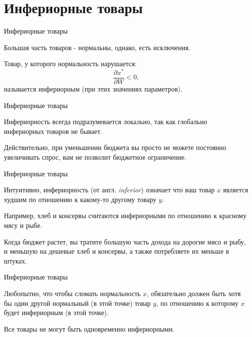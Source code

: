 \documentclass{beamer}
\begin{document}
\section{Инфериорные товары}

\begin{frame}{Инфериорные товары}

Большая часть товаров - нормальны, однако, есть исключения.

\begin{definition}
Товар, у которого нормальность нарушается:
$$\frac{\partial x^{\ast}}{\partial W} < 0,$$ 
называется \alert{инфериорным} (при этих значениях параметров). 
\end{definition}
\end{frame}

\begin{frame}{Инфериорные товары}

Инфериорность всегда подразумевается локально, так как \alert{глобально инфериорных товаров не бывает}. 

Действительно, при уменьшении бюджета вы просто не можете постоянно увеличивать спрос, вам не позволит бюджетное ограничение.

\end{frame}

\begin{frame}{Инфериорные товары}

Интуитивно, инфериорность (от англ. \textit{inferior}) означает что ваш товар $x$ является худшим по отношению к какому-то другому товару $y$. 

Например, хлеб и консервы считаются инфериорными по отношению к красному мясу и рыбе. 

Когда бюджет растет, вы тратите большую часть дохода на дорогие мясо и рыбу, и меньшую на дешевые хлеб и консервы, а также потребляете их меньше в штуках.

\end{frame}

\begin{frame}{Инфериорные товары}

Любопытно, что чтобы сломать нормальность $x$, обязательно должен быть хотя бы один другой нормальный (в этой точке) товар $y$, по отношению к которому $x$ будет инфериорным (в этой точке).

\begin{lemma}
Все товары не могут быть одновременно инфериорными.
\end{lemma}

\end{frame}
\end{document}
